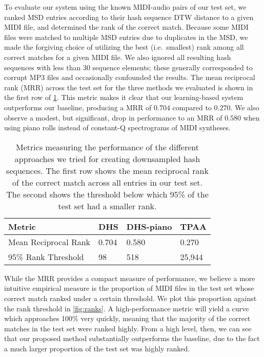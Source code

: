 To evaluate our system using the known MIDI-audio pairs of our test set, we ranked MSD entries according to their hash sequence DTW distance to a given MIDI file, and determined the rank of the correct match.
Because some MIDI files were matched to multiple MSD entries due to duplicates in the MSD, we made the forgiving choice of utilizing the best (i.e.\ smallest) rank among all correct matches for a given MIDI file.
We also ignored all resulting hash sequences with less than 30 sequence elements; these generally corresponded to corrupt MP3 files and occasionally confounded the results.
The mean reciprocal rank (MRR) across the test set for the three methods we evaluated is shown in the first row of \cref{tab:ranking_metrics}.
This metric makes it clear that our learning-based system outperforms our baseline, producing a MRR of $0.704$ compared to $0.270$.
We also observe a modest, but significant, drop in performance to an MRR of $0.580$ when using piano rolls instead of constant-Q spectrograms of MIDI syntheses.

\begin{table}
  \begin{center}
    \begin{tabular}{l l l l}
      \toprule
      Metric & \textbf{DHS} & \textbf{DHS-piano} & \textbf{TPAA} \\
      \midrule
      Mean Reciprocal Rank & 0.704 & 0.580 & 0.270 \\
      95\% Rank Threshold & 98 & 518 & 25,944 \\
      \bottomrule
    \end{tabular}
  \end{center}
  \caption[Performance of different downsampled hash sequence approaches]{Metrics measuring the performance of the different approaches we tried for creating downsampled hash sequences.
The first row shows the mean reciprocal rank of the correct match across all entries in our test set.
The second shows the threshold below which 95\% of the test set had a smaller rank.}
  \label{tab:ranking_metrics}
\end{table}

While the MRR provides a compact measure of performance, we believe a more intuitive empirical measure is the proportion of MIDI files in the test set whose correct match ranked under a certain threshold.
We plot this proportion against the rank threshold in \cref{fig:ranks}.
A high-performance metric will yield a curve which approaches 100\% very quickly, meaning that the majority of the correct matches in the test set were ranked highly.
From a high level, then, we can see that our proposed method substantially outperforms the baseline, due to the fact a much larger proportion of the test set was highly ranked.

